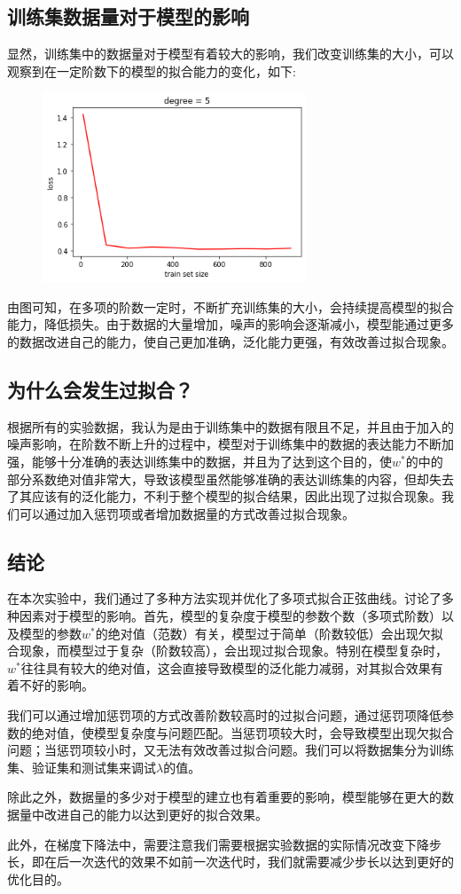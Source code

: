\documentclass[12pt]{article}
\begin{document}
\subsection{训练集数据量对于模型的影响}
显然，训练集中的数据量对于模型有着较大的影响，我们改变训练集的大小，可以观察到在一定阶数下的模型的拟合能力的变化，如下:
\begin{figure}[H]
    \centering
    \includegraphics[width=0.7\textwidth]{s3.png}
\end{figure}
由图可知，在多项的阶数一定时，不断扩充训练集的大小，会持续提高模型的拟合能力，降低损失。由于数据的大量增加，噪声的影响会逐渐减小，模型能通过更多的数据改进自己的能力，使自己更加准确，泛化能力更强，有效改善过拟合现象。\par
\subsection{为什么会发生过拟合？}
根据所有的实验数据，我认为是由于训练集中的数据有限且不足，并且由于加入的噪声影响，在阶数不断上升的过程中，模型对于训练集中的数据的表达能力不断加强，能够十分准确的表达训练集中的数据，并且为了达到这个目的，使$w^*$的中的部分系数绝对值非常大，导致该模型虽然能够准确的表达训练集的内容，但却失去了其应该有的泛化能力，不利于整个模型的拟合结果，因此出现了过拟合现象。我们可以通过加入惩罚项或者增加数据量的方式改善过拟合现象。
\subsection{结论}
在本次实验中，我们通过了多种方法实现并优化了多项式拟合正弦曲线。讨论了多种因素对于模型的影响。首先，模型的复杂度于模型的参数个数（多项式阶数）以及模型的参数$w^*$的绝对值（范数）有关，模型过于简单（阶数较低）会出现欠拟合现象，而模型过于复杂（阶数较高），会出现过拟合现象。特别在模型复杂时，$w^*$往往具有较大的绝对值，这会直接导致模型的泛化能力减弱，对其拟合效果有着不好的影响。\par
我们可以通过增加惩罚项的方式改善阶数较高时的过拟合问题，通过惩罚项降低参数的绝对值，使模型复杂度与问题匹配。当惩罚项较大时，会导致模型出现欠拟合问题；当惩罚项较小时，又无法有效改善过拟合问题。我们可以将数据集分为训练集、验证集和测试集来调试$\lambda$的值。\par
除此之外，数据量的多少对于模型的建立也有着重要的影响，模型能够在更大的数据量中改进自己的能力以达到更好的拟合效果。\par
此外，在梯度下降法中，需要注意我们需要根据实验数据的实际情况改变下降步长，即在后一次迭代的效果不如前一次迭代时，我们就需要减少步长以达到更好的优化目的。\par
\end{document}
